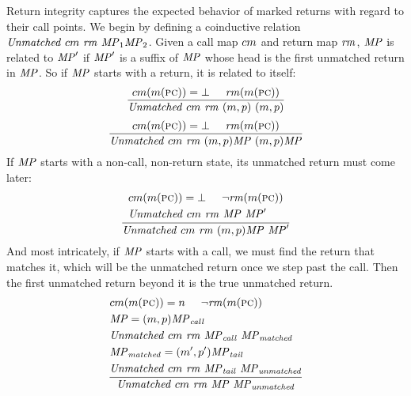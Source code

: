 \documentclass[acmsmall,review,anonymous]{acmart}\settopmatter{printfolios=true,printccs=false,printacmref=false}
\begin{document}
    Return integrity captures the expected behavior of marked returns with
    regard to their call points. We begin by defining a coinductive relation
    \(\mathit{Unmatched}\ \callmap\ \retmap\ \MPT_1 \MPT_2\). Given a call map
    \(cm\) and return map \(\mathit{rm}\), \(\mathit{MP}\) is related to
    \(\mathit{MP}'\) if \(\mathit{MP}'\) is a suffix of \(\mathit{MP}\) whose head is the first
    unmatched return in \(\mathit{MP}\). So if \(\mathit{MP}\) starts with a return,
    it is related to itself:
%
    \[\frac{\callmap(\mach(\PCname)) = \bot
              \hspace{.5cm} \retmap(\mach(\PCname))}
           {\mathit{Unmatched}\ \callmap\ \retmap\ \mpstate{\mach}{\pol}\ 
              \mpstate{\mach}{\pol}}\]
    \[\frac{\callmap(\mach(\PCname)) = \bot
              \hspace{.5cm} \retmap(\mach(\PCname))}
           {\mathit{Unmatched}\ \callmap\ \retmap\ \mpstate{\mach}{\pol}\MPT\ 
              \mpstate{\mach}{\pol}\MPT}\]
%
    If \(\mathit{MP}\) starts with a non-call, non-return state, its unmatched
    return must come later:
%
    \[\frac{\begin{split}
            & \callmap(\mach(\PCname)) = \bot
              \hspace{.5cm} \neg \retmap(\mach(\PCname)) \\
            & \mathit{Unmatched}\ \callmap\ \retmap\ \MPT\ \MPT'
            \end{split}}
           {\mathit{Unmatched}\ \callmap\ \retmap\ 
            \mpstate{\mach}{\pol}\MPT\ \MPT'}\]
%   
    And most intricately, if \(\mathit{MP}\) starts with a call, we must find the
    return that matches it, which will be the unmatched return once we step
    past the call. Then the first unmatched return beyond it is the true
    unmatched return.
    \[\frac{\begin{split}
            & \callmap(\mach(\PCname)) = n
              \hspace{.5cm} \neg \retmap(\mach(\PCname)) \\
            & \MPT = \mpstate{\mach}{\pol} \MPT_{\mathit{call}} \\
            & \mathit{Unmatched}\ \callmap\ \retmap\ \MPT_{\mathit{call}}\ \MPT_{\mathit{matched}} \\
            & \MPT_{\mathit{matched}} = \mpstate{\mach'}{\pol'} \MPT_{\mathit{tail}} \\
            & \mathit{Unmatched}\ \callmap\ \retmap\ \MPT_{\mathit{tail}}\ \MPT_{\mathit{unmatched}} \\
            \end{split}}
            {\mathit{Unmatched}\ \callmap\ \retmap\ \MPT\ \MPT_{\mathit{unmatched}}}\]
\end{document}
